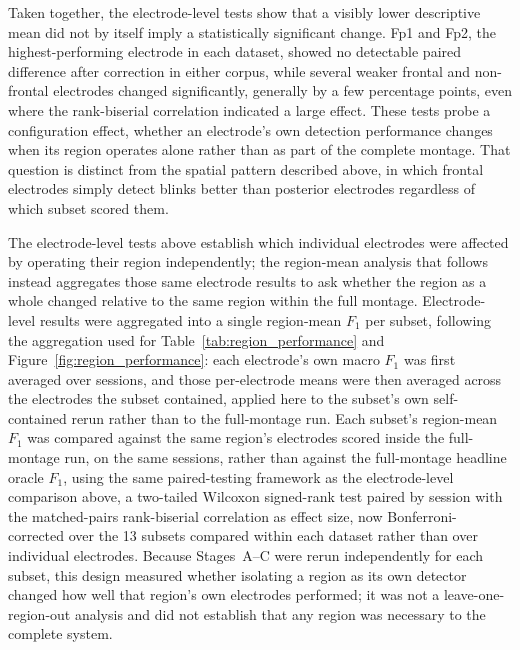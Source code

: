 Taken together, the electrode-level tests show that a visibly lower descriptive mean did not by itself imply a statistically significant change. Fp1 and Fp2, the highest-performing electrode in each dataset, showed no detectable paired difference after correction in either corpus, while several weaker frontal and non-frontal electrodes changed significantly, generally by a few percentage points, even where the rank-biserial correlation indicated a large effect. These tests probe a configuration effect, whether an electrode's own detection performance changes when its region operates alone rather than as part of the complete montage. That question is distinct from the spatial pattern described above, in which frontal electrodes simply detect blinks better than posterior electrodes regardless of which subset scored them.

The electrode-level tests above establish which individual electrodes were affected by operating their region independently; the region-mean analysis that follows instead aggregates those same electrode results to ask whether the region as a whole changed relative to the same region within the full montage. Electrode-level results were aggregated into a single region-mean $F_1$ per subset, following the aggregation used for Table~\ref{tab:region_performance} and Figure~\ref{fig:region_performance}: each electrode's own macro $F_1$ was first averaged over sessions, and those per-electrode means were then averaged across the electrodes the subset contained, applied here to the subset's own self-contained rerun rather than to the full-montage run. Each subset's region-mean $F_1$ was compared against the same region's electrodes scored inside the full-montage run, on the same sessions, rather than against the full-montage headline oracle $F_1$, using the same paired-testing framework as the electrode-level comparison above, a two-tailed Wilcoxon signed-rank test paired by session with the matched-pairs rank-biserial correlation as effect size, now Bonferroni-corrected over the 13 subsets compared within each dataset rather than over individual electrodes. Because Stages~A--C were rerun independently for each subset, this design measured whether isolating a region as its own detector changed how well that region's own electrodes performed; it was not a leave-one-region-out analysis and did not establish that any region was necessary to the complete system.

